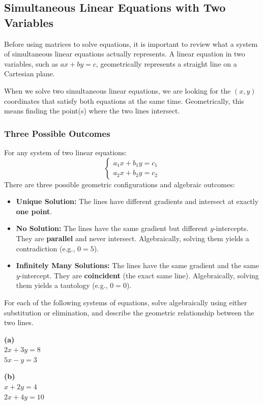 
\subsection{Simultaneous Linear Equations with Two Variables}

Before using matrices to solve equations, it is important to review what a system of simultaneous linear equations actually represents. A linear equation in two variables, such as $ax + by = c$, geometrically represents a straight line on a Cartesian plane.

When we solve two simultaneous linear equations, we are looking for the $(x, y)$ coordinates that satisfy both equations at the same time. Geometrically, this means finding the point(s) where the two lines intersect.

\subsubsection*{Three Possible Outcomes}

For any system of two linear equations:
\[
\begin{cases}
a_1 x + b_1 y = c_1 \\
a_2 x + b_2 y = c_2
\end{cases}
\]
There are three possible geometric configurations and algebraic outcomes:

\begin{itemize}[leftmargin=*]
  \item \textbf{Unique Solution:} The lines have different gradients and intersect at exactly \textbf{one point}.
  \item \textbf{No Solution:} The lines have the same gradient but different $y$-intercepts. They are \textbf{parallel} and never intersect. Algebraically, solving them yields a contradiction (e.g., $0 = 5$).
  \item \textbf{Infinitely Many Solutions:} The lines have the same gradient and the same $y$-intercept. They are \textbf{coincident} (the exact same line). Algebraically, solving them yields a tautology (e.g., $0 = 0$).
\end{itemize}

\bigskip

\begin{problem}
For each of the following systems of equations, solve algebraically using either substitution or elimination, and describe the geometric relationship between the two lines.

\textbf{(a)} \\
$2x + 3y = 8$ \\
$5x - y = 3$

\medskip
\textbf{(b)} \\
$x + 2y = 4$ \\
$2x + 4y = 10$
\end{problem}

